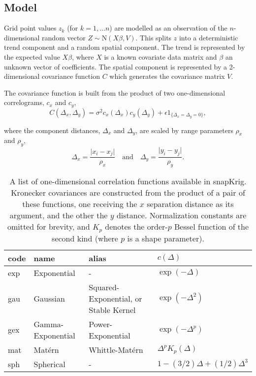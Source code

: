 \hypertarget{model}{%
\subsection{Model}\label{model}}

Grid point values \(z_k\) (for \(k=1,\dots n\)) are modelled as an observation of the \(n\)-dimensional random vector \(Z \sim \text{N} \left( X\beta, V \right)\). This splits \(z\) into a deterministic trend component and a random spatial component. The trend is represented by the expected value \(X\beta\), where \(X\) is a known covariate data matrix and \(\beta\) an unknown vector of coefficients. The spatial component is represented by a 2-dimensional covariance function \(C\) which generates the covariance matrix \(V\).

The covariance function is built from the product of two one-dimensional correlograms, \(c_x\) and \(c_y\),
\begin{equation}
C \left( \Delta_x, \Delta_y \right) = \sigma^2 c_x \left( \Delta_x \right) c_y \left( \Delta_y \right) + \epsilon 1_{ \{ \Delta_x = \Delta_y = 0 \}},
\label{eq:covfun}
\end{equation}

where the component distances, \(\Delta_x\) and \(\Delta_y\), are scaled by range parameters \(\rho_x\) and \(\rho_y\),
\begin{equation}
\Delta_x = \frac{ \lvert x_i - x_j \rvert }{ \rho_x } \quad \text{and} \quad \Delta_y = \frac{ \lvert y_i - y_j \rvert }{ \rho_y }. \label{eq:dfun}
\end{equation}

\begin{table}

\caption{\label{tab:cfun-table-latex}A list of one-dimensional correlation functions available in snapKrig. Kronecker covariances are constructed from the product of a pair of these functions, one receiving the $x$ separation distance as its argument, and the other the $y$ distance. Normalization constants are omitted for brevity, and $K_p$ denotes the order-$p$ Bessel function of the second kind (where $p$ is a shape parameter).}
\centering
\fontsize{9}{11}\selectfont
\begin{tabular}[t]{llll}
\toprule
code & name & alias & $c\left( \Delta \right)$\\
\midrule
exp & Exponential & - & $\exp\left( -\Delta \right)$\\
gau & Gaussian & Squared-Exponential, or Stable Kernel & $\exp\left( -\Delta^2 \right)$\\
gex & Gamma-Exponential & Power-Exponential & $\exp\left( -\Delta^p \right)$\\
mat & Mat\'ern & Whittle-Mat\'ern & $\Delta^p K_p\left( \Delta \right)$\\
sph & Spherical & - & $1 - (3/2)\Delta + (1/2)\Delta^3$\\
\bottomrule
\end{tabular}
\end{table}


